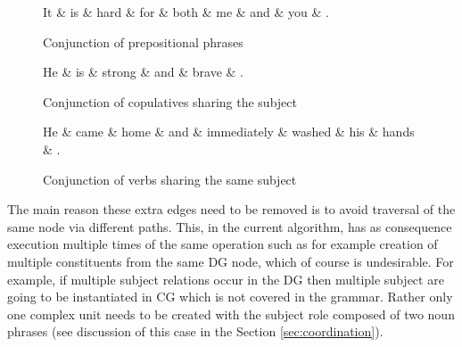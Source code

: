 \begin{figure}[!ht]
\centering
\begin{minipage}[b]{0.45\textwidth}
\centering
\begin{dependency}
		\begin{deptext}[]
	It \& is \& hard \& for \& both \& me \& and \& you \& . \\ %
		\end{deptext}
	\end{dependency}
\caption{Conjunction of prepositional phrases}
\label{fig:conj-preps}
\end{minipage}
\quad
\begin{minipage}[b]{0.45\textwidth}
\centering
	\begin{dependency}
		\begin{deptext}[]
	He \& is \& strong \& and \& brave \& . \\
		\end{deptext}
	\end{dependency}
\caption{Conjunction of copulatives sharing the subject}
\label{fig:conj-copula-subj}
\end{minipage}
\end{figure}
\begin{figure}[!ht]
\centering
	\begin{dependency}
		\begin{deptext}[]
	He \& came \& home \& and \& immediately \& washed \& his \& hands \& . \\ %
		\end{deptext}
	\end{dependency}
\caption{Conjunction of verbs sharing the same subject}
\label{fig:conj-verb-subj}
\end{figure}

The main reason these extra edges need to be removed is to avoid traversal of the same node via different paths. This, in the current algorithm, has as consequence execution multiple times of the same operation such as for example creation of multiple constituents from the same DG node, which of course is undesirable. For example, if multiple subject relations occur in the DG then multiple subject are going to be instantiated in CG which is not covered in the grammar. Rather only one complex unit needs to be created with the subject role composed of two noun phrases (see discussion of this case in the Section \ref{sec:coordination}). 


